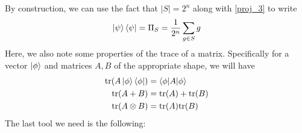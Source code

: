 \message{ !name(report_1.tex)}\documentclass[11pt]{article}
\theoremstyle{definition}
\theoremstyle{plain}
\begin{document}
By construction, we can use the fact that $|S| = 2^n$ along with {\ref{proj_3}} to write
\begin{equation}\label{prelim_1} 
  \ket{\psi} \bra{\psi} = \Pi_S = \frac{1}{2^n} \sum\limits_{g \in S} g
\end{equation}
Here, we also note some properties of the trace of a matrix. Specifically for a vector $\ket{\phi}$ and matrices $A, B$ of the appropriate shape, we will have
\begin{align}
  \text{tr}(A \ket{\phi} \bra{\phi}) &=  \braket{\phi | A | \phi} \\
  \text{tr}(A + B) &= \text{tr}(A) + \text{tr}(B) \\ 
  \text{tr}(A \otimes B) &= \text{tr}(A) \text{tr}(B)
\end{align}
The last tool we need is the following:\\
\end{document}

